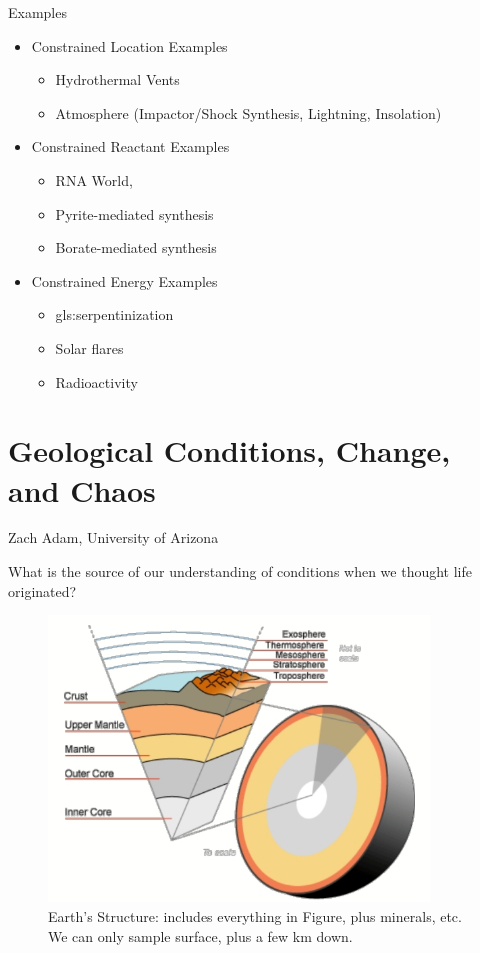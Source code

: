 \documentclass[]{article}
\begin{document}
Examples
\begin{itemize}
	\item Constrained Location Examples \begin{itemize}
		\item Hydrothermal Vents\cite{martin2006origin}
		\item Atmosphere (Impactor/Shock Synthesis, Lightning,
		Insolation)\cite{chyba1992endogenous} \cite{miller1959organic}
	\end{itemize}
	\item Constrained Reactant Examples 
	\begin{itemize}
		\item RNA World\cite{powner2009synthesis},
		\item Pyrite-mediated synthesis\cite{wachtershauser1993cradle}
		\item Borate-mediated synthesis\cite{grew2011borate}
	\end{itemize}
	\item Constrained Energy Examples
	\begin{itemize}
		\item \Gls{gls:serpentinization}\cite{schrenk2013serpentinization}
		\item Solar flares\cite{airapetian2016prebiotic}
		\item Radioactivity\cite{yi2018radiolytic} \cite{adam2018estimating}
	\end{itemize}
\end{itemize}
\section{Geological Conditions, Change, and Chaos}

Zach Adam, University of Arizona\cite{spencer2017growth}

What is the source of our understanding of conditions when we thought life originated?
\begin{figure}[H]
	\caption[Earth's Structure]{Earth's Structure: includes everything in Figure, plus minerals, etc. We can only sample surface, plus a few km down.}\label{fig:EarthStructure} 
	\includegraphics[width=0.9\textwidth]{EarthStructure}
\end{figure}
\end{document}
